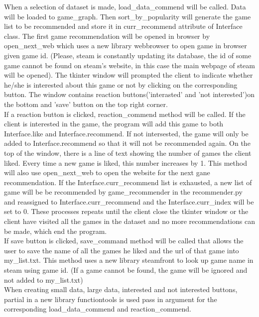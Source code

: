 \documentclass{article}
\begin{document}
When a selection of dataset is made, load\_data\_commend will be called. Data will be loaded to game\_graph. Then sort\_by\_popularity will generate the game list to be recommended and store it in curr\_recommend attribute of Interface class. The first game recommendation will be opened in browser by open\_next\_web which uses a new library webbrowser to open game in browser given game id. (Please, steam is constantly updating its database, the id of some game cannot be found on steam's website, in this case the main webpage of steam will be opened). The tkinter window will prompted the client to indicate whether he/she is interested about this game or not by clicking on the corresponding button. The window contains reaction buttons('interasted' and 'not interested')on the bottom and 'save' button on the top right corner. \\
If a reaction button is clicked, reaction\_commend method will be called. If the client is interested in the game, the program will add this game to both Interface.like and Interface.recommend. If not intersested, the game will only be added to Interface.recommend so that it will not be recommended again. On the top of the window, there is a line of text showing the number of games the client liked. Every time a new game is liked, this number increases by 1. This method will also use open\_next\_web to open the website for the next gane recommendation. If the Interface.curr\_recommend list is exhausted, a new list of game will be be recommended by game\_recommender in the recommender.py and  reassigned to Interface.curr\_recommend and the Interface.curr\_index will be set to 0. These processes repeats until the client close the tkinter window or the client have visited all the games in the dataset and no more recommendations can be made, which end the program. \\
If save button is clicked, save\_command method will be called that allows the user to save the name of all the games he liked and the url of that game into my\_list.txt. This method uses a new library steamfront to look up game name in steam using game id. (If a game cannot be found, the game will be ignored and not added to my\_list.txt) \\
When creating small data, large data, interested and not interested buttons, partial in a new library functiontools is used pass in argument for the corresponding load\_data\_commend and reaction\_commend.
        
\end{document}
